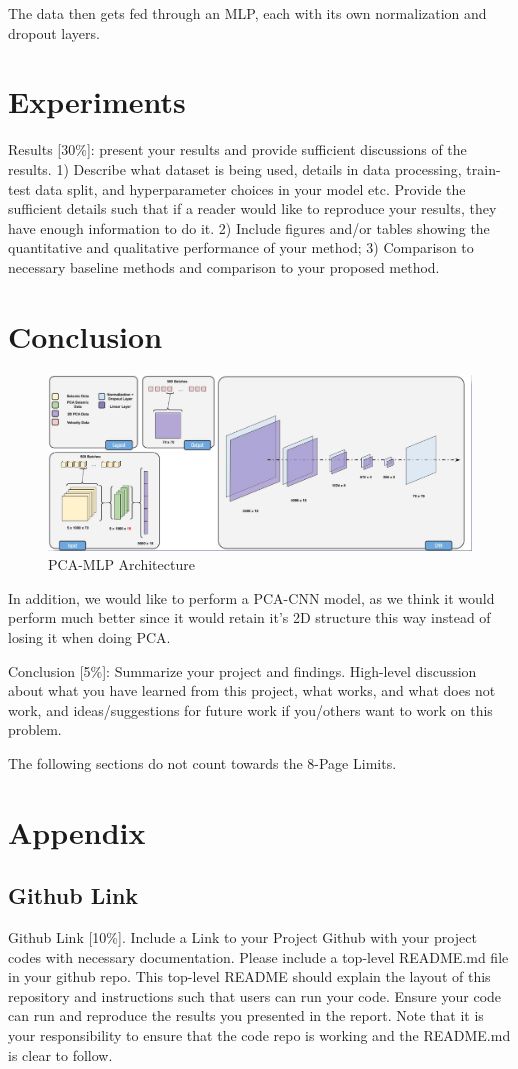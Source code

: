 \documentclass{article}
\newcommand{\instructions}[1]{{\color{blue} #1}}
\begin{document}
The data then gets fed through an MLP, each with its own normalization and dropout layers.


\section{Experiments}
\instructions{Results [30\%]: present your results and provide sufficient discussions of the results. 1) Describe what dataset is being used, details in data processing, train-test data split, and hyperparameter choices in your model etc. Provide the sufficient details such that if a reader would like to reproduce your results, they have enough information to do it. 2) Include figures and/or tables showing the quantitative and qualitative performance of your method; 3) Comparison to necessary baseline methods and comparison to your proposed method.} 

\section{Conclusion}

\begin{figure}[H]
    \centering
    \includegraphics[width=0.5\linewidth]{figures/conclusion1.png}
    \caption{PCA-MLP Architecture}
    \label{fig:conclusion1}
\end{figure}    

In addition, we would like to perform a PCA-CNN model, as we think it would perform much better since it would retain it's 2D structure this way instead of losing it when doing PCA.


\instructions{Conclusion [5\%]: Summarize your project and findings. High-level discussion about what you have learned from this project, what works, and what does not work, and ideas/suggestions for future work if you/others want to work on this problem.} 



\newpage
\instructions{The following sections do not count towards the 8-Page Limits.}
\section*{Appendix}
\subsection*{Github Link}
\instructions{Github Link [10\%]. Include a Link to your Project Github with your project codes with necessary documentation. Please include a top-level README.md file in your github repo. This top-level README should explain the layout of this repository and instructions such that users can run your code. Ensure your code can run and reproduce the results you presented in the report. Note that it is your responsibility to ensure that the code repo is working and the README.md is clear to follow.}
\end{document}
